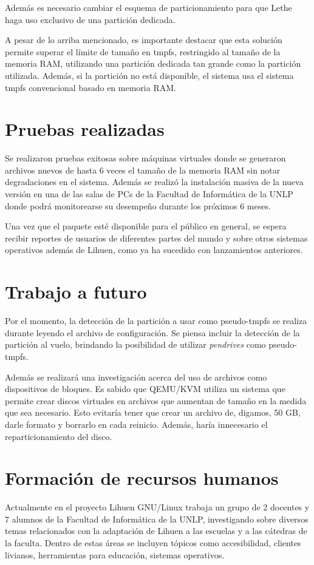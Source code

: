 \documentclass[final,narroweqnarray,inline,twoside]{ieee}
\begin{document}
Además es necesario cambiar el esquema de particionamiento para que Lethe haga uso exclusivo de una partición dedicada.

A pesar de lo arriba mencionado, es importante destacar que esta solución permite superar el límite de tamaño en tmpfs,
restringido al tamaño de la memoria RAM, utilizando una partición
dedicada tan grande como la partición utilizada. Además, si la partición no está disponible, el sistema usa el sistema tmpfs
convencional basado en memoria RAM.

\section{Pruebas realizadas}
Se realizaron pruebas exitosas sobre máquinas virtuales donde se generaron archivos nuevos de hasta 6 veces el tamaño de la
memoria RAM sin notar degradaciones en el sistema. Además se realizó la instalación masiva de la nueva versión en una de las
salas de PCs de la Facultad de Informática de la UNLP donde podrá monitorearse su desempeño durante los próximos 6
meses.

Una vez que el paquete esté disponible para el público en general, se espera recibir reportes de usuarios de diferentes
partes del mundo y sobre otros sistemas operativos además de Lihuen, como ya ha sucedido con lanzamientos anteriores.

\section{Trabajo a futuro}
Por el momento, la detección de la partición a usar como pseudo-tmpfs se realiza durante leyendo el archivo de
configuración. Se piensa incluir la detección de la partición al vuelo, brindando la posibilidad de utilizar
\textit{pendrives} como pseudo-tmpfs.

Además se realizará una investigación acerca del uso de archivos como dispositivos de bloques. Es sabido que QEMU/KVM utiliza
un sistema que permite crear discos virtuales en archivos que aumentan de tamaño en la medida que sea necesario. Esto
evitaría tener que crear un archivo de, digamos, 50 GB, darle formato y borrarlo en cada reinicio. Además, haría innecesario
el reparticionamiento del disco.

\section{Formación de recursos humanos}
Actualmente en el proyecto Lihuen GNU/Linux trabaja un grupo de 2 docentes y 7 alumnos de la Facultad de Informática de la
UNLP, investigando sobre diversos temas relacionados con la adaptación de Lihuen a las escuelas y a las cátedras de la
faculta. Dentro de estas áreas se incluyen tópicos como accesibilidad, clientes livianos, herramientas para educación,
sistemas operativos. 
\end{document}
